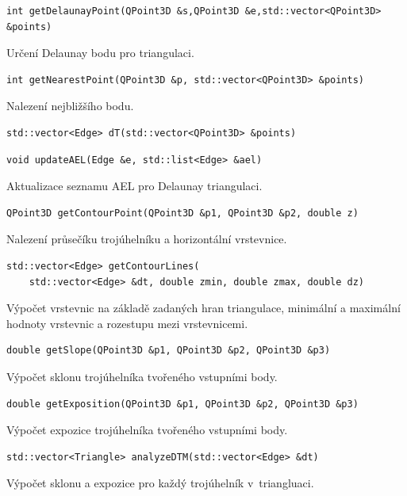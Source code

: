 \documentclass[a4paper, 12pt, oneside, titlepage]{article} %
\begin{document}
\begin{verbatim}
int getDelaunayPoint(QPoint3D &s,QPoint3D &e,std::vector<QPoint3D> &points)
\end{verbatim}
Určení Delaunay bodu pro triangulaci.\\

\begin{verbatim}
int getNearestPoint(QPoint3D &p, std::vector<QPoint3D> &points)
\end{verbatim}
Nalezení nejbližšího bodu.\\

\begin{verbatim}
std::vector<Edge> dT(std::vector<QPoint3D> &points)
\end{verbatim}

\begin{verbatim}
void updateAEL(Edge &e, std::list<Edge> &ael)
\end{verbatim}
Aktualizace seznamu AEL pro Delaunay triangulaci.\\

\begin{verbatim}
QPoint3D getContourPoint(QPoint3D &p1, QPoint3D &p2, double z)
\end{verbatim}
Nalezení průsečíku trojúhelníku a horizontální vrstevnice.\\

\begin{verbatim}
std::vector<Edge> getContourLines(
    std::vector<Edge> &dt, double zmin, double zmax, double dz)
\end{verbatim}
Výpočet vrstevnic na základě zadaných hran triangulace, minimální a maximální hodnoty vrstevnic a rozestupu mezi vrstevnicemi.\\

\begin{verbatim}
double getSlope(QPoint3D &p1, QPoint3D &p2, QPoint3D &p3)
\end{verbatim}
Výpočet sklonu trojúhelníka tvořeného vstupními body.\\

\begin{verbatim}
double getExposition(QPoint3D &p1, QPoint3D &p2, QPoint3D &p3)
\end{verbatim}
Výpočet expozice trojúhelníka tvořeného vstupními body.\\

\begin{verbatim}
std::vector<Triangle> analyzeDTM(std::vector<Edge> &dt)
\end{verbatim}
Výpočet sklonu a expozice pro každý trojúhelník v~triangluaci.\\
\end{document}
